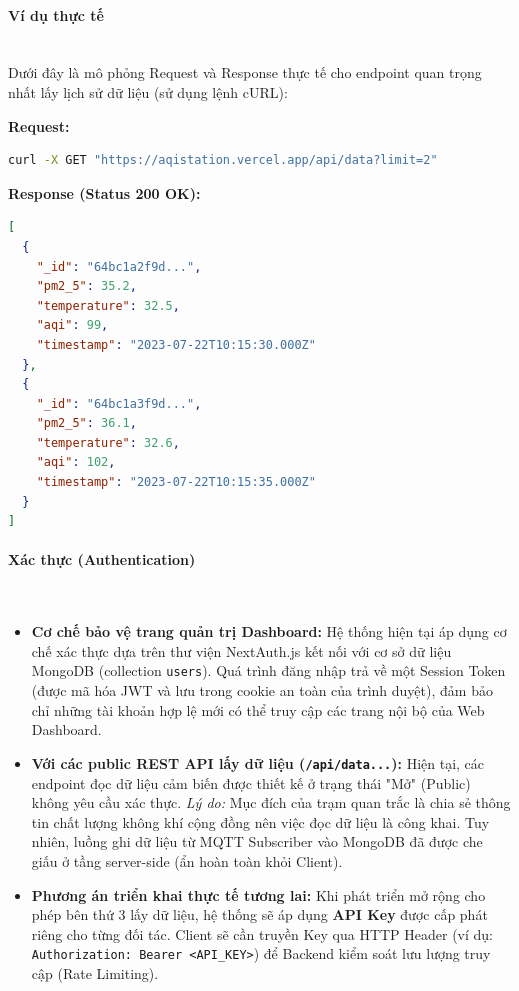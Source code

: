 \documentclass[12pt,a4paper]{article}
\begin{document}
\paragraph{Ví dụ thực tế}\mbox{}\\
Dưới đây là mô phỏng Request và Response thực tế cho endpoint quan trọng nhất lấy lịch sử dữ liệu (sử dụng lệnh cURL):

\textbf{Request:}
\begin{lstlisting}[language=bash, basicstyle=\footnotesize\ttfamily, backgroundcolor=\color{gray!10}, frame=single]
curl -X GET "https://aqistation.vercel.app/api/data?limit=2"
\end{lstlisting}

\textbf{Response (Status 200 OK):}
\begin{lstlisting}[language=json, basicstyle=\footnotesize\ttfamily, backgroundcolor=\color{gray!10}, frame=single]
[
  {
    "_id": "64bc1a2f9d...",
    "pm2_5": 35.2,
    "temperature": 32.5,
    "aqi": 99,
    "timestamp": "2023-07-22T10:15:30.000Z"
  },
  {
    "_id": "64bc1a3f9d...",
    "pm2_5": 36.1,
    "temperature": 32.6,
    "aqi": 102,
    "timestamp": "2023-07-22T10:15:35.000Z"
  }
]
\end{lstlisting}

\paragraph{Xác thực (Authentication)}\mbox{}\\
\begin{itemize}
    \item \textbf{Cơ chế bảo vệ trang quản trị Dashboard:} Hệ thống hiện tại áp dụng cơ chế xác thực dựa trên thư viện NextAuth.js kết nối với cơ sở dữ liệu MongoDB (collection \texttt{users}). Quá trình đăng nhập trả về một Session Token (được mã hóa JWT và lưu trong cookie an toàn của trình duyệt), đảm bảo chỉ những tài khoản hợp lệ mới có thể truy cập các trang nội bộ của Web Dashboard.
    \item \textbf{Với các public REST API lấy dữ liệu (\texttt{/api/data...}):} Hiện tại, các endpoint đọc dữ liệu cảm biến được thiết kế ở trạng thái "Mở" (Public) không yêu cầu xác thực. \textit{Lý do:} Mục đích của trạm quan trắc là chia sẻ thông tin chất lượng không khí cộng đồng nên việc đọc dữ liệu là công khai. Tuy nhiên, luồng ghi dữ liệu từ MQTT Subscriber vào MongoDB đã được che giấu ở tầng server-side (ẩn hoàn toàn khỏi Client).
    \item \textbf{Phương án triển khai thực tế tương lai:} Khi phát triển mở rộng cho phép bên thứ 3 lấy dữ liệu, hệ thống sẽ áp dụng \textbf{API Key} được cấp phát riêng cho từng đối tác. Client sẽ cần truyền Key qua HTTP Header (ví dụ: \texttt{Authorization: Bearer <API\_KEY>}) để Backend kiểm soát lưu lượng truy cập (Rate Limiting).
\end{itemize}
\end{document}
